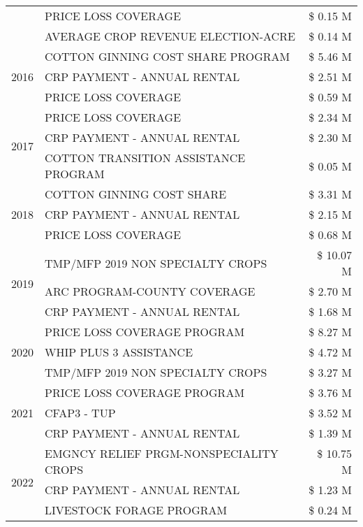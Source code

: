 \begin{tabular}{llr}
 & PRICE LOSS COVERAGE & \$ 0.15 M \\
 & AVERAGE CROP REVENUE ELECTION-ACRE & \$ 0.14 M \\
\cline{1-3}
\multirow[t]{3}{*}{2016} & COTTON GINNING COST SHARE PROGRAM & \$ 5.46 M \\
 & CRP PAYMENT - ANNUAL RENTAL & \$ 2.51 M \\
 & PRICE LOSS COVERAGE & \$ 0.59 M \\
\cline{1-3}
\multirow[t]{3}{*}{2017} & PRICE LOSS COVERAGE & \$ 2.34 M \\
 & CRP PAYMENT - ANNUAL RENTAL & \$ 2.30 M \\
 & COTTON TRANSITION ASSISTANCE PROGRAM & \$ 0.05 M \\
\cline{1-3}
\multirow[t]{3}{*}{2018} & COTTON GINNING COST SHARE & \$ 3.31 M \\
 & CRP PAYMENT - ANNUAL RENTAL & \$ 2.15 M \\
 & PRICE LOSS COVERAGE & \$ 0.68 M \\
\cline{1-3}
\multirow[t]{3}{*}{2019} & TMP/MFP 2019 NON SPECIALTY CROPS & \$ 10.07 M \\
 & ARC PROGRAM-COUNTY COVERAGE & \$ 2.70 M \\
 & CRP PAYMENT - ANNUAL RENTAL & \$ 1.68 M \\
\cline{1-3}
\multirow[t]{3}{*}{2020} & PRICE LOSS COVERAGE PROGRAM & \$ 8.27 M \\
 & WHIP PLUS 3 ASSISTANCE & \$ 4.72 M \\
 & TMP/MFP 2019 NON SPECIALTY CROPS & \$ 3.27 M \\
\cline{1-3}
\multirow[t]{3}{*}{2021} & PRICE LOSS COVERAGE PROGRAM & \$ 3.76 M \\
 & CFAP3 - TUP & \$ 3.52 M \\
 & CRP PAYMENT - ANNUAL RENTAL & \$ 1.39 M \\
\cline{1-3}
\multirow[t]{3}{*}{2022} & EMGNCY RELIEF PRGM-NONSPECIALITY CROPS & \$ 10.75 M \\
 & CRP PAYMENT - ANNUAL RENTAL & \$ 1.23 M \\
 & LIVESTOCK FORAGE PROGRAM & \$ 0.24 M \\
\cline{1-3}
\bottomrule
\end{tabular}
